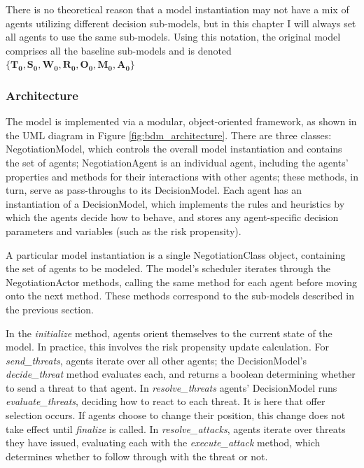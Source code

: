 There is no theoretical reason that a model instantiation may not have a mix of agents utilizing different decision sub-models, but in this chapter I will always set all agents to use the same sub-models. Using this notation, the original model comprises all the baseline sub-models and is denoted $\{\mathbf{T_0, S_0, W_0, R_0, O_0, M_0, A_0}\}$

\subsubsection{Architecture}

The model is implemented via a modular, object-oriented framework, as shown in the UML diagram in Figure \ref{fig:bdm_architecture}. There are three classes: NegotiationModel, which controls the overall model instantiation and contains the set of agents; NegotiationAgent is an individual agent, including the agents' properties and methods for their interactions with other agents; these methods, in turn, serve as pass-throughs to its DecisionModel. Each agent has an instantiation of a DecisionModel, which implements the rules and heuristics by which the agents decide how to behave, and stores any agent-specific decision parameters and variables (such as the risk propensity). 

A particular model instantiation is a single NegotiationClass object, containing the set of agents to be modeled. The model's scheduler iterates through the NegotiationActor methods, calling the same method for each agent before moving onto the next method. These methods correspond to the sub-models described in the previous section.

In the \emph{initialize} method, agents orient themselves to the current state of the model. In practice, this involves the risk propensity update calculation. For \emph{send\_threats}, agents iterate over all other agents; the DecisionModel's \emph{decide\_threat} method evaluates each, and returns a boolean determining whether to send a threat to that agent. In \emph{resolve\_threats} agents' DecisionModel runs \emph{evaluate\_threats}, deciding how to react to each threat. It is here that offer selection occurs. If agents choose to change their position, this change does not take effect until \emph{finalize} is called. In \emph{resolve\_attacks}, agents iterate over threats they have issued, evaluating each with the \emph{execute\_attack} method, which determines whether to follow through with the threat or not.

